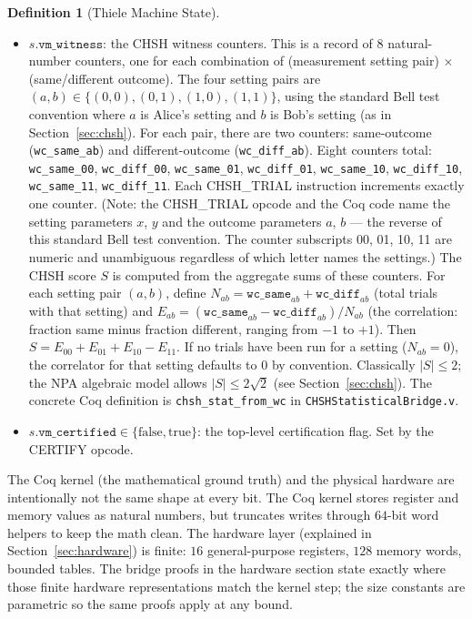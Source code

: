 \documentclass[11pt,a4paper]{article}
\theoremstyle{plain}
\theoremstyle{definition}
\newtheorem{definition}{Definition}[section]
\theoremstyle{remark}
\begin{document}
\begin{definition}[Thiele Machine State]
\begin{itemize}
\item $s.\texttt{vm\_witness}$: the CHSH witness counters. This is a record of 8 natural-number counters, one for each combination of (measurement setting pair) $\times$ (same/different outcome). The four setting pairs are $(a,b) \in \{(0,0),(0,1),(1,0),(1,1)\}$, using the standard Bell test convention where $a$ is Alice's setting and $b$ is Bob's setting (as in Section~\ref{sec:chsh}). For each pair, there are two counters: same-outcome (\texttt{wc\_same\_ab}) and different-outcome (\texttt{wc\_diff\_ab}). Eight counters total: \texttt{wc\_same\_00}, \texttt{wc\_diff\_00}, \texttt{wc\_same\_01}, \texttt{wc\_diff\_01}, \texttt{wc\_same\_10}, \texttt{wc\_diff\_10}, \texttt{wc\_same\_11}, \texttt{wc\_diff\_11}. Each CHSH\_TRIAL instruction increments exactly one counter. (Note: the CHSH\_TRIAL opcode and the Coq code name the setting parameters $x$, $y$ and the outcome parameters $a$, $b$ --- the reverse of this standard Bell test convention. The counter subscripts 00, 01, 10, 11 are numeric and unambiguous regardless of which letter names the settings.) The CHSH score $S$ is computed from the aggregate sums of these counters. For each setting pair $(a,b)$, define $N_{ab} = \texttt{wc\_same}_{ab} + \texttt{wc\_diff}_{ab}$ (total trials with that setting) and $E_{ab} = (\texttt{wc\_same}_{ab} - \texttt{wc\_diff}_{ab}) / N_{ab}$ (the correlation: fraction same minus fraction different, ranging from $-1$ to $+1$). Then $S = E_{00} + E_{01} + E_{10} - E_{11}$. If no trials have been run for a setting ($N_{ab} = 0$), the correlator for that setting defaults to 0 by convention. Classically $|S| \leq 2$; the NPA algebraic model allows $|S| \leq 2\sqrt{2}$ (see Section~\ref{sec:chsh}). The concrete Coq definition is \texttt{chsh\_stat\_from\_wc} in \texttt{CHSHStatisticalBridge.v}.
\item $s.\texttt{vm\_certified} \in \{\text{false}, \text{true}\}$: the top-level certification flag. Set by the CERTIFY opcode.
\end{itemize}
\end{definition}

The Coq kernel (the mathematical ground truth) and the physical hardware are intentionally not the same shape at every bit. The Coq kernel stores register and memory values as natural numbers, but truncates writes through $64$-bit word helpers to keep the math clean. The hardware layer (explained in Section~\ref{sec:hardware}) is finite: $16$ general-purpose registers, $128$ memory words, bounded tables. The bridge proofs in the hardware section state exactly where those finite hardware representations match the kernel step; the size constants are parametric so the same proofs apply at any bound.
\end{document}
